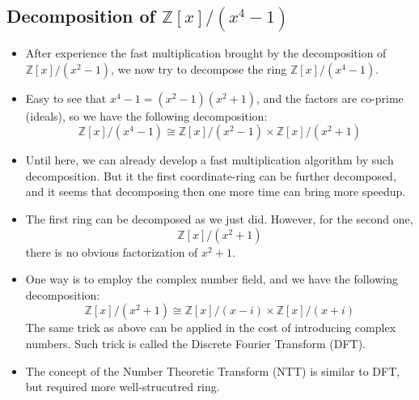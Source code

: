 \subsection{Decomposition of \( \mathbb{Z}[x]/(x^4-1) \)}

\begin{frame}
    \begin{itemize}
        \item After experience the fast multiplication brought by the decomposition of 
            \( \mathbb{Z}[x]/(x^{2}-1) \), we now try to decompose the ring 
            \( \mathbb{Z}[x]/(x^{4}-1) \).
        \item Easy to see that \(x^{4}-1 = (x^{2}-1)(x^2+1)\), 
            and the factors are co-prime (ideals),
            so we have the following decomposition:
            \[ \mathbb{Z}[x]/(x^4 - 1) \cong 
            \mathbb{Z}[x]/(x^2 - 1) \times 
            \mathbb{Z}[x]/(x^2 + 1) \]
        \item Until here, we can already develop a fast multiplication algorithm by such decomposition.
            But it the first coordinate-ring can be further decomposed,
            and it seems that decomposing then one more time can bring more speedup.
        \item The first ring can be decomposed as we just did.
            However, for the second one,
            \[ \mathbb{Z}[x]/(x^2 + 1) \]
            there is no obvious factorization of \(x^2 + 1\).
        \item One way is to employ the complex number field, 
            and we have the following decomposition:
            \[ \mathbb{Z}[x]/(x^2 + 1) \cong 
            \mathbb{Z}[x]/(x - i) \times 
            \mathbb{Z}[x]/(x + i) \]
            The same trick as above can be applied in the cost of introducing complex numbers.
            Such trick is called the Discrete Fourier Transform (DFT).
        \item The concept of the Number Theoretic Transform (NTT) is similar to DFT, 
            but required more well-strucutred ring.
    \end{itemize}
\end{frame}

